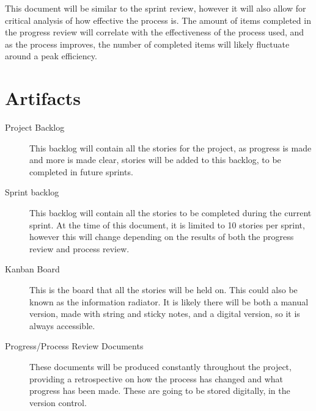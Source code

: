 \documentclass[11pt,fleqn,twoside]{article}
\begin{document}
\begin{description}
     This document will be similar to the sprint review, however it will also allow for critical analysis of how effective the process is. The amount of items completed in the progress review will correlate with the effectiveness of the process used, and as the process improves, the number of completed items will likely fluctuate around a peak efficiency.
\end{description}


\section{Artifacts}
\begin{description}
  \item[Project Backlog]
    This backlog will contain all the stories for the project, as progress is made and more is made clear, stories will be added to this backlog, to be completed in future sprints.
    
  \item[Sprint backlog]
    This backlog will contain all the stories to be completed during the current sprint. At the time of this document, it is limited to 10 stories per sprint, however this will change depending on the results of both the progress review and process review.
    
  \item[Kanban Board]
    This is the board that all the stories will be held on. This could also be known as the information radiator. It is likely there will be both a manual version, made with string and sticky notes, and a digital version, so it is always accessible.
    
   \item[Progress/Process Review Documents]
     These documents will be produced constantly throughout the project, providing a retrospective on how the process has changed and what progress has been made. These are going to be stored digitally, in the version control.

\end{description}
%
%
\end{document}
